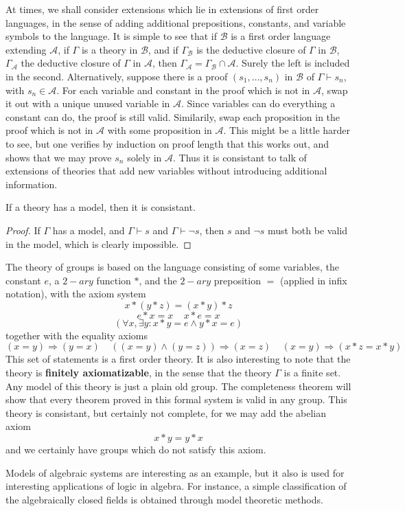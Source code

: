 At times, we shall consider extensions which lie in extensions of first order languages, in the sense of adding additional prepositions, constants, and variable symbols to the language. It is simple to see that if $\mathcal{B}$ is a first order language extending $\mathcal{A}$, if $\Gamma$ is a theory in $\mathcal{B}$, and if $\Gamma_\mathcal{B}$ is the deductive closure of $\Gamma$ in $\mathcal{B}$, $\Gamma_{\mathcal{A}}$ the deductive closure of $\Gamma$ in $\mathcal{A}$, then $\Gamma_\mathcal{A} = \Gamma_\mathcal{B} \cap \mathcal{A}$. Surely the left is included in the second. Alternatively, suppose there is a proof $(s_1, \dots, s_n)$ in $\mathcal{B}$ of $\Gamma \vdash s_n$, with $s_n \in \mathcal{A}$. For each variable and constant in the proof which is not in $\mathcal{A}$, swap it out with a unique unused variable in $\mathcal{A}$. Since variables can do everything a constant can do, the proof is still valid. Similarily, swap each proposition in the proof which is not in $\mathcal{A}$ with some proposition in $\mathcal{A}$. This might be a little harder to see, but one verifies by induction on proof length that this works out, and shows that we may prove $s_n$ solely in $\mathcal{A}$. Thus it is consistant to talk of extensions of theories that add new variables without introducing additional information.

\begin{lemma}
    If a theory has a model, then it is consistant.
\end{lemma}
\begin{proof}
    If $\Gamma$ has a model, and $\Gamma \vdash s$ and $\Gamma \vdash \neg s$, then $s$ and $\neg s$ must both be valid in the model, which is clearly impossible.
\end{proof}

\begin{example}
    The theory of groups is based on the language consisting of some variables, the constant $e$, a $2-ary$ function $*$, and the $2-ary$ preposition $=$ (applied in infix notation), with the axiom system
    \[ x * (y * z) = (x * y) * z \]
    \[ e * x = x\ \ \ \ \ x * e = x \]
    \[ (\forall x, \exists y: x * y = e \wedge y * x = e) \]
    together with the equality axioms
    \[ (x = y) \Rightarrow (y = x)\ \ \ \ \ ((x = y) \wedge (y = z)) \Rightarrow (x = z)\ \ \ \ \ (x = y) \Rightarrow (x * z = x * y) \]
    This set of statements is a first order theory. It is also interesting to note that the theory is {\bf finitely axiomatizable}, in the sense that the theory $\Gamma$ is a finite set. Any model of this theory is just a plain old group. The completeness theorem will show that every theorem proved in this formal system is valid in any group. This theory is consistant, but certainly not complete, for we may add the abelian axiom
    \[ x * y = y * x \]
    and we certainly have groups which do not satisfy this axiom.

    Models of algebraic systems are interesting as an example, but it also is used for interesting applications of logic in algebra. For instance, a simple classification of the algebraically closed fields is obtained through model theoretic methods.
\end{example}

